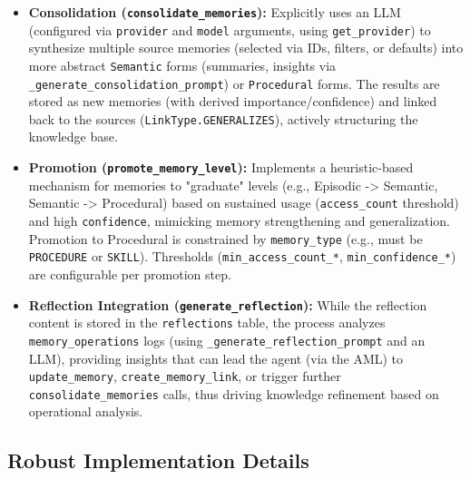 \documentclass[12pt,a4paper]{article}
\newcommand{\code}[1]{\nolinkurl{#1}}
\begin{document}
\begin{itemize}
    \item \textbf{Consolidation (\code{consolidate\_memories}):} Explicitly uses an LLM (configured via \code{provider} and \code{model} arguments, using \code{get\_provider}) to synthesize multiple source memories (selected via IDs, filters, or defaults) into more abstract \code{Semantic} forms (summaries, insights via \code{\_generate\_consolidation\_prompt}) or \code{Procedural} forms. The results are stored as new memories (with derived importance/confidence) and linked back to the sources (\code{LinkType.GENERALIZES}), actively structuring the knowledge base.

    \item \textbf{Promotion (\code{promote\_memory\_level}):} Implements a heuristic-based mechanism for memories to "graduate" levels (e.g., Episodic -> Semantic, Semantic -> Procedural) based on sustained usage (\code{access\_count} threshold) and high \code{confidence}, mimicking memory strengthening and generalization. Promotion to Procedural is constrained by \code{memory\_type} (e.g., must be \code{PROCEDURE} or \code{SKILL}). Thresholds (\code{min\_access\_count\_*}, \code{min\_confidence\_*}) are configurable per promotion step.

    \item \textbf{Reflection Integration (\code{generate\_reflection}):} While the reflection content is stored in the \code{reflections} table, the process analyzes \code{memory\_operations} logs (using \code{\_generate\_reflection\_prompt} and an LLM), providing insights that can lead the agent (via the AML) to \code{update\_memory}, \code{create\_memory\_link}, or trigger further \code{consolidate\_memories} calls, thus driving knowledge refinement based on operational analysis.
\end{itemize}

\subsection{Robust Implementation Details}
\end{document}
